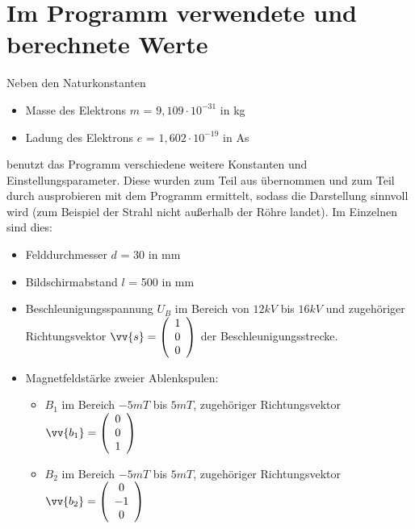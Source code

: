 \section{Im Programm verwendete und berechnete Werte}
Neben den Naturkonstanten
\begin{itemize}
    \item Masse des Elektrons $m$ =  $9,109 \cdot 10^{-31}$ in kg
    \item Ladung des Elektrons $e$ = $1,602 \cdot 10^{-19}$ in As
\end{itemize} 
benutzt das Programm verschiedene weitere Konstanten und Einstellungsparameter. 
Diese wurden zum Teil aus \cite{Gente1950} übernommen und zum Teil durch ausprobieren mit dem Programm ermittelt, sodass die Darstellung sinnvoll wird (zum Beispiel der Strahl nicht außerhalb der Röhre landet).
Im Einzelnen sind dies:
\begin{itemize}
    \item Felddurchmesser $d$ = 30 in mm
    \item Bildschirmabstand $l$ = 500 in mm
    \item Beschleunigungsspannung $U_B$ im Bereich von $12 kV$ bis $16 kV$ und  zugehöriger Richtungsvektor $\vv{s} = \vektor{1}{0}{0}$ der Beschleunigungsstrecke.
    \item Magnetfeldstärke zweier Ablenkspulen:
    \begin{itemize}
        \item $B_1$ im Bereich $-5 mT$ bis $5 mT$, zugehöriger Richtungsvektor $\vv{b_1} = \vektor{0}{0}{1}$ %
        \item $B_2$ im Bereich $-5 mT$ bis $5 mT$, zugehöriger Richtungsvektor $\vv{b_2} = \vektor{0}{-1}{0}$ %
    \end{itemize}
\end{itemize}


